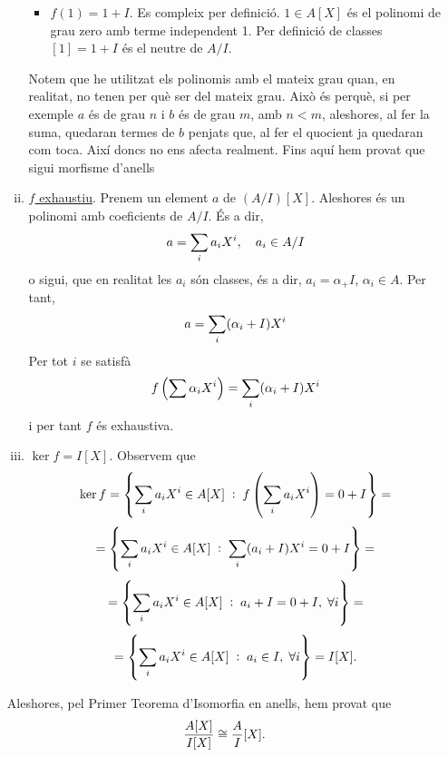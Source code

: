 \documentclass[../main.tex]{subfiles}
\begin{document}
\begin{sol}
\begin{enumerate}[(a)]
\begin{enumerate}[(i)]
\begin{itemize}
            \item \underline{$f(1) = 1+I$}. Es compleix per definició. $1\in A[X]$ és el polinomi de grau zero amb terme independent 1. Per definició de classes $[1] = 1+I$ és el neutre de $A/I$.
        \end{itemize}
        Notem que he utilitzat els polinomis amb el mateix grau quan, en realitat, no tenen per què ser del mateix grau. Això és perquè, si per exemple $a$ és de grau $n$ i $b$ és de grau $m$, amb $n<m$, aleshores, al fer la suma, quedaran termes de $b$ penjats que, al fer el quocient ja quedaran com toca. Així doncs no ens afecta realment. Fins aquí hem provat que sigui morfisme d'anells
        
        \item \underline{$f$ exhaustiu}. Prenem un element $a$ de $(A/I)[X]$. Aleshores és un polinomi amb coeficients de $A/I$. És a dir,
        \begin{equation}
            \notag
            a = \sum_i a_iX^{i},\quad a_i\in A/I
        \end{equation}
        o sigui, que en realitat les $a_i$ són classes, és a dir, $a_i = \alpha_+I$, $\alpha_i\in A$. Per tant, 
        \begin{equation}
            \notag
            a = \sum_i (\alpha_i+I)X^{i}
        \end{equation}
        Per tot $i$ se satisfà
        \begin{equation}
            \notag
            f\left(\sum\alpha_iX^{i}\right) = \sum_i(\alpha_i+I)X^{i}
        \end{equation}
        i per tant $f$ és exhaustiva.
        
        
        
        \item \underline{$\ker f = I[X]$}. Observem que
        \begin{equation}
            \notag
            \ker f = \left\{\sum_i a_iX^{i}\in A[X]\;:\;f\left(\sum_ia_iX^{i}\right) = 0+I\right\} = 
        \end{equation}
        \begin{equation}
            \notag
            =\left\{\sum_ia_iX^{i}\in A[X]\;:\;\sum_i(a_i+I)X^{i} = 0+I\right\} = 
        \end{equation}
        \begin{equation}
            \notag
            =\left\{\sum_ia_iX^{i}\in A[X]\;:\;a_i+I = 0+I,\;\forall i\right\} =
        \end{equation}
        \begin{equation}
            \notag
             = \left\{\sum_ia_iX^{i}\in A[X]\;:\; a_i\in I,\;\forall i\right\} = I[X].
        \end{equation}
    \end{enumerate}
    Aleshores, pel Primer Teorema d'Isomorfia en anells, hem provat que
    \begin{equation}
        \notag
        \frac{A[X]}{I[X]}\cong \frac{A}{I}[X].
    \end{equation}
    

\end{enumerate}
\end{sol}
\end{document}
